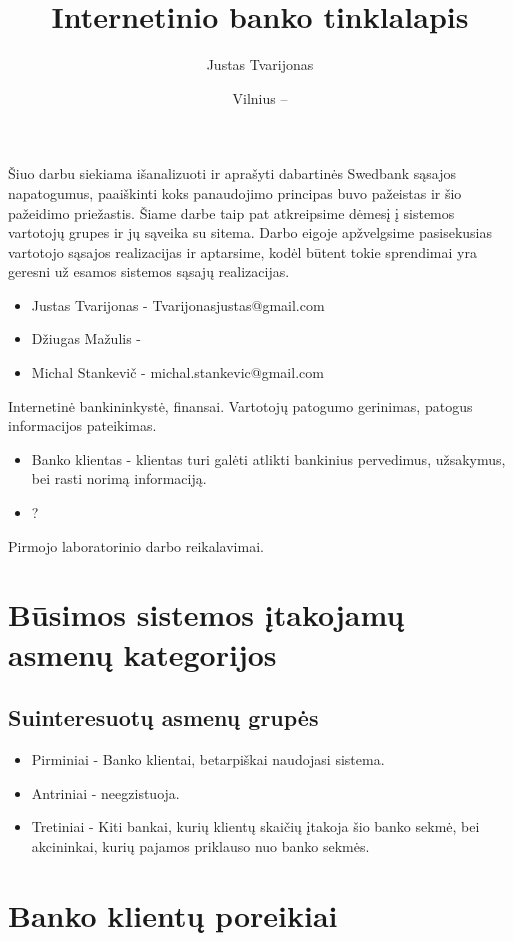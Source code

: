 \documentclass{VUMIFPSkursinis}
\title{Internetinio banko tinklalapis}
\author{Justas Tvarijonas}
\date{Vilnius – \the\year}
\begin{document}
\maketitle

\tableofcontents
{}
Šiuo darbu siekiama išanalizuoti ir aprašyti dabartinės Swedbank sąsajos napatogumus, paaiškinti koks panaudojimo principas buvo pažeistas ir šio pažeidimo priežastis.
Šiame darbe taip pat atkreipsime dėmesį į sistemos vartotojų grupes ir jų sąveika su sitema.
Darbo eigoje apžvelgsime pasisekusias vartotojo sąsajos realizacijas ir aptarsime, kodėl būtent tokie sprendimai yra geresni už esamos sistemos sąsajų realizacijas.
\begin{itemize}
	\item Justas Tvarijonas - Tvarijonasjustas@gmail.com
	\item Džiugas Mažulis -
	\item Michal Stankevič - michal.stankevic@gmail.com
\end{itemize}
Internetinė bankininkystė, finansai.
Vartotojų patogumo gerinimas, patogus informacijos pateikimas.
\begin{itemize}
	\item Banko klientas - klientas turi galėti atlikti bankinius pervedimus, užsakymus, bei rasti norimą informaciją.
	\item ?
\end{itemize}
Pirmojo laboratorinio darbo reikalavimai.
\section{Būsimos sistemos įtakojamų asmenų kategorijos}
\subsection{Suinteresuotų asmenų grupės}
\begin{itemize}
	\item Pirminiai - Banko klientai, betarpiškai naudojasi sistema.
	\item Antriniai - neegzistuoja.
	\item Tretiniai - Kiti bankai, kurių klientų skaičių įtakoja šio banko sekmė, bei akcininkai, kurių pajamos priklauso nuo banko sekmės.
\end{itemize}
\section{Banko klientų poreikiai}
\end{document}
